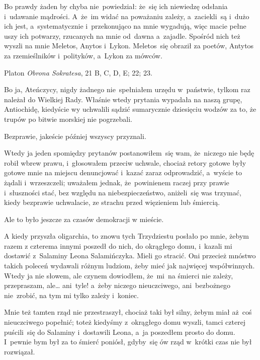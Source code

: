 \documentclass[a4paper,11pt]{article}
\newcommand{\attribA}[1]{#1}
\begin{document}
Bo prawdy żaden by chyba nie~powiedział: że~się ich niewiedzę odsłania
i~udawanie mądrości. A~że~im widać na poważaniu zależy, a~zaciekli~są
i~dużo ich jest, a~systematycznie i~przekonująco na mnie wygadują,
więc macie pełne uszy ich potwarzy, rzucanych na mnie od~dawna
a~zajadle. Spośród nich też wyszli na mnie Meletos, Anytos i~Lykon.
Meletos~się obraził za poetów, Antytos za rzemieślników i~polityków,
a~Lykon za mówców.


\attribA{Platon \textit{Obrona Sokratesa}, 21 B, C, D, E; 22; 23.}

\vspace{\spaceThree}



\vspace{\spaceThree}
Bo ja, Ateńczycy, nigdy żadnego nie~spełniałem urzędu w~państwie,
tylkom raz należał do Wielkiej Rady. Właśnie wtedy prytania wypadała
na naszą grupę, Antiochidę, kiedyście wy uchwalili sądzić sumarycznie
dziesięciu wodzów za to, że trupów po bitwie morskiej nie pogrzebali.

Bezprawie, jakeście później wszyscy przyznali.

Wtedy ja jeden spomiędzy prytanów postanowiłem~się wam, że~niczego nie
będę robił wbrew prawu, i~głosowałem przeciw uchwale, chociaż retory
gotowe były gotowe mnie na miejscu denuncjować i~kazać zaraz
odprowadzić, a~wyście to żądali i~wrzeszczeli; uważałem jednak,
że~powinienem raczej przy prawie i~słuszności stać, bez względu na
niebezpieczeństwo, aniżeli~się was trzymać, kiedy bezprawie
uchwalacie, ze strachu przed więzieniem lub śmiercią.

Ale to było jeszcze za czasów demokracji w mieście.

A kiedy przyszła oligarchia, to znowu tych Trzydziestu posłało po
mnie, żebym razem z czterema innymi poszedł do nich, do okrągłego
domu, i~kazali mi dostawić z~Salaminy Leona Salamińczyka. Mieli go
stracić. Oni przecież mnóstwo takich poleceń wydawali różnym ludziom,
żeby mieć jak najwięcej współwinnych. Wtedy ja nie słowem, ale czynem
dowiodłem, że~mi~na śmierci nie zależy, przepraszam, ale\ldots
ani~tyle! a~żeby niczego nieuczciwego, ani~bezbożnego nie~zrobić, na
tym mi tylko zależy i~koniec.

Mnie też tamten rząd nie przestraszył, chociaż taki był silny, żebym
miał aż~coś nieuczciwego popełnić; toteż kiedyśmy z~okrągłego domu
wyszli, tamci czterej puścili~się do Salaminy i~dostawili Leona, a~ja
poszedłem prosto do domu. I~pewnie bym był za to śmierć poniósł,
gdyby~się ów rząd w~krótki czas nie był rozwiązał.
\end{document}
